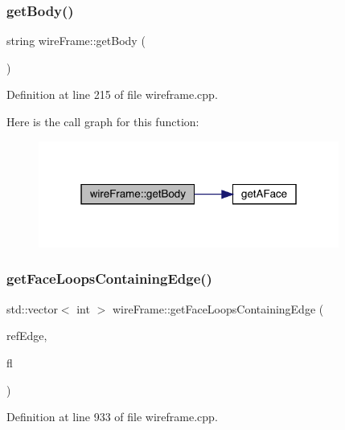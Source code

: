 \subsubsection{\texorpdfstring{get\+Body()}{getBody()}}
{\footnotesize\ttfamily string wire\+Frame\+::get\+Body (\begin{DoxyParamCaption}{ }\end{DoxyParamCaption})}



Definition at line 215 of file wireframe.\+cpp.

Here is the call graph for this function\+:
\nopagebreak
\begin{figure}[H]
\begin{center}
\leavevmode
\includegraphics[width=280pt]{classwire_frame_adafc56f2ed107ea6d8449da17cc9f39b_cgraph}
\end{center}
\end{figure}
\mbox{\label{classwire_frame_aff23ae34c3bab0a3a4b6967e4b955ecb}} 
\subsubsection{\texorpdfstring{get\+Face\+Loops\+Containing\+Edge()}{getFaceLoopsContainingEdge()}}
{\footnotesize\ttfamily std\+::vector$<$ int $>$ wire\+Frame\+::get\+Face\+Loops\+Containing\+Edge (\begin{DoxyParamCaption}\item[{\mbox{\hyperlink{structedge3_d}{edge3D}}}]{ref\+Edge,  }\item[{\mbox{\hyperlink{classface_loop}{face\+Loop}}}]{fl }\end{DoxyParamCaption})}



Definition at line 933 of file wireframe.\+cpp.

